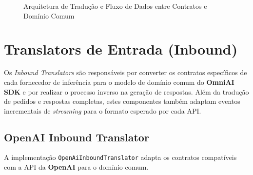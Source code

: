 \begin{figure}[H]
{%
    }
    \caption{Arquitetura de Tradução e Fluxo de Dados entre Contratos e Domínio Comum}
    \label{fig:translator-arch}
\end{figure}

    \section{Translators de Entrada (Inbound)}

Os \textit{Inbound Translators} são responsáveis por converter os contratos específicos de cada fornecedor de inferência para o modelo de domínio comum do \textbf{OmniAI SDK} e por realizar o processo inverso na geração de respostas.
Além da tradução de pedidos e respostas completas, estes componentes também adaptam eventos incrementais de \textit{streaming} para o formato esperado por cada API.

    \subsection{\textbf{OpenAI} Inbound Translator}

A implementação \texttt{OpenAiInboundTranslator} adapta os contratos compatíveis com a API da \textbf{OpenAI} para o domínio comum.
    
